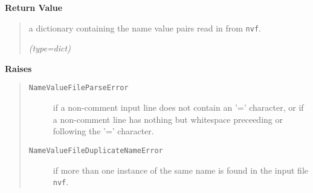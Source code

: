 \begin{boxedminipage}{\funcwidth}
      \textbf{Return Value}
    \vspace{-1ex}

      \begin{quote}
      a dictionary containing the name value pairs read in from 
      \texttt{nvf}.

      {\it (type=dict)}

      \end{quote}

      \textbf{Raises}
    \vspace{-1ex}

      \begin{quote}
        \begin{description}

          \item[\texttt{NameValueFileParseError}]

          if a non-comment input line does not contain an '=' character, or
          if a non-comment line has nothing but whitespace preceeding or 
          following the '=' character.

          \item[\texttt{NameValueFileDuplicateNameError}]

          if more than one instance of the same name is found in the input 
          file \texttt{nvf}.

        \end{description}

      \end{quote}

    \end{boxedminipage}

    \label{SatStress:SatStress:test}

    \vspace{0.5ex}

